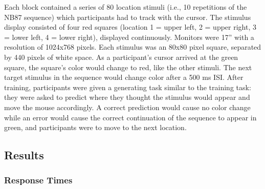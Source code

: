 \documentclass[man,floatsintext]{apa6}
\begin{document}
Each block contained a series of 80 location stimuli (i.e., 10 repetitions of the NB87 sequence) which participants had to track with the cursor. The stimulus display consisted of four red squares (location 1 = upper left, 2 = upper right, 3 = lower left, 4 = lower right), displayed continuously. Monitors were 17'' with a resolution of 1024x768 pixels. Each stimulus was an 80x80 pixel square, separated by 440 pixels of white space. As a participant's cursor arrived at the green square, the square's color would change to red, like the other stimuli. The next target stimulus in the sequence would change color after a 500 ms ISI. After training, participants were given a generating task similar to the training task: they were asked to predict where they thought the stimulus would appear and move the mouse accordingly. A correct prediction would cause no color change while an error would cause the correct continuation of the sequence to appear in green, and participants were to move to the next location. 

\subsection{Results}

\subsubsection{Response Times}
\end{document}
